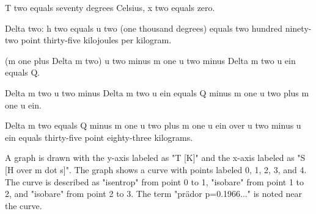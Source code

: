 T two equals seventy degrees Celsius, x two equals zero.

Delta two:
h two equals u two (one thousand degrees) equals two hundred ninety-two point thirty-five kilojoules per kilogram.

(m one plus Delta m two) u two minus m one u two minus Delta m two u ein equals Q.

Delta m two u two minus Delta m two u ein equals Q minus m one u two plus m one u ein.

Delta m two equals Q minus m one u two plus m one u ein over u two minus u ein equals thirty-five point eighty-three kilograms.

A graph is drawn with the y-axis labeled as "T [K]" and the x-axis labeled as "S [H over m dot s]". The graph shows a curve with points labeled 0, 1, 2, 3, and 4. The curve is described as "isentrop" from point 0 to 1, "isobare" from point 1 to 2, and "isobare" from point 2 to 3. The term "prädor p=0.1966..." is noted near the curve.